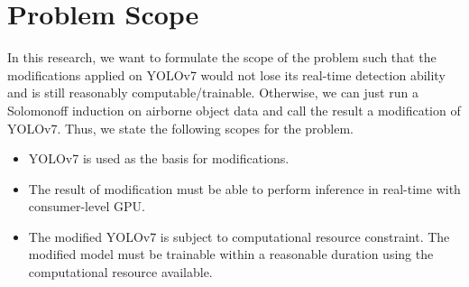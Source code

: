 \section{Problem Scope}
    In this research, we want to formulate the scope of the problem such that the modifications applied
    on YOLOv7 would not lose its real-time detection ability and is still reasonably computable/trainable.
    Otherwise, we can just run a Solomonoff induction on airborne object data and call the result a modification
    of YOLOv7. Thus, we state the following scopes for the problem.
    \begin{itemize}%
        \item YOLOv7 is used as the basis for modifications. 
        \item The result of modification must be able to perform inference in real-time with consumer-level GPU.
        \item The modified YOLOv7 is subject to computational resource constraint. The modified model must be trainable within a reasonable duration using the computational resource
        available.%
    \end{itemize}

